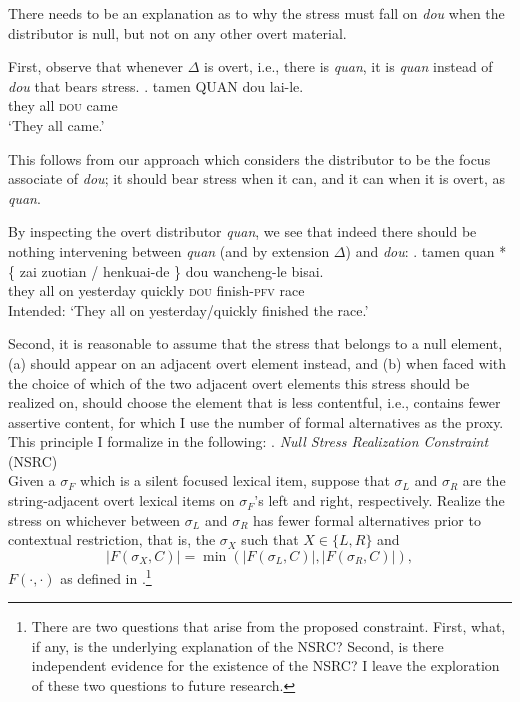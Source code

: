 \documentclass[12pt]{article}
\begin{document}
There needs to be an explanation as to why the stress must fall on \emph{dou} when the distributor is null, but not on any other overt material.

First, observe that whenever \(\Delta\) is overt, i.e., there is \emph{quan}, it is \emph{quan} instead of \emph{dou} that bears stress.
\ex. \gll
tamen QUAN dou lai-le. \\
they all \textsc{dou} came \\
\glt `They all came.'

This follows from our approach which considers the distributor to be the focus associate of \emph{dou}; it should bear stress when it can, and it can when it is overt, as \emph{quan}.

By inspecting the overt distributor \emph{quan}, we see that indeed there should be nothing intervening between \emph{quan} (and by extension \(\Delta\)) and \emph{dou}:
\ex. \gll
tamen quan *\{ zai zuotian / henkuai-de \} dou wancheng-le bisai. \\
they all {} on yesterday {} quickly {} \textsc{dou} finish-\textsc{pfv} race \\
\glt Intended: `They all on yesterday/quickly finished the race.'

Second, it is reasonable to assume that the stress that belongs to a null element, (a) should appear on an adjacent overt element instead, and (b) when faced with the choice of which of the two adjacent overt elements this stress should be realized on, should choose the element that is less contentful, i.e., contains fewer assertive content, for which I use the number of formal alternatives as the proxy.
This principle I formalize in the following:
\ex. \emph{Null Stress Realization Constraint} (NSRC)\\
Given a \(\sigma_F\) which is a silent focused lexical item, suppose that \(\sigma_L\) and \(\sigma_R\) are the string-adjacent overt lexical items on \(\sigma_F\)'s left and right, respectively.
Realize the stress on whichever between \(\sigma_L\) and \(\sigma_R\) has fewer formal alternatives prior to contextual restriction, that is, the \(\sigma_X\) such that \(X \in \{L, R\}\) and \[\lvert F(\sigma_X, C) \rvert = \min(\lvert F(\sigma_L, C) \rvert, \lvert F(\sigma_R, C) \rvert),\] \(F(\cdot, \cdot)\) as defined in \citet[ex. (37)]{foxCharacterizationAlternatives2011}.\footnote{
  There are two questions that arise from the proposed constraint. 
  First, what, if any, is the underlying explanation of the NSRC?
  Second, is there independent evidence for the existence of the NSRC?
  I leave the exploration of these two questions to future research.
}
\end{document}
